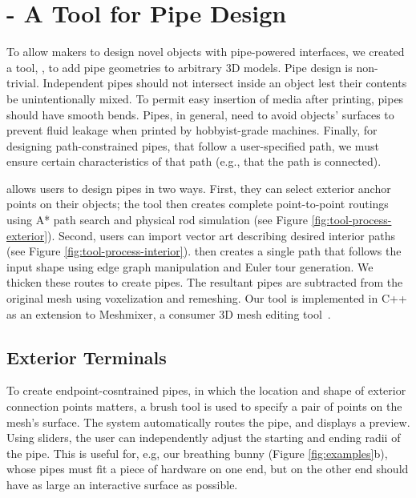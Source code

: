 \section{\systemname - A Tool for Pipe Design}
To allow makers to design novel objects with pipe-powered interfaces, we created a tool, \systemnamenospace, to add pipe geometries to arbitrary 3D models. Pipe design is non-trivial.  Independent pipes should not intersect inside an object lest their contents be unintentionally mixed.  To permit easy insertion of media after printing, pipes should have smooth bends.  Pipes, in general, need to avoid objects' surfaces to prevent fluid leakage when printed by hobbyist-grade machines.  Finally, for designing path-constrained pipes, that follow a user-specified path, we must ensure certain characteristics of that path (e.g., that the path is connected). 

 \systemname allows users to design pipes in two ways. First, they can select exterior anchor points on their objects; the tool then creates complete point-to-point routings using A* path search and physical rod simulation (see Figure \ref{fig:tool-process-exterior}). Second, users can import vector art describing desired interior paths (see Figure \ref{fig:tool-process-interior}).  \systemname then creates a single path that follows the input shape using edge graph manipulation and Euler tour generation.  We thicken these routes to create pipes.  The resultant pipes are subtracted from the original mesh using voxelization and remeshing. Our tool is implemented in C++ as an extension to Meshmixer, a consumer 3D mesh editing tool~\cite{Schmidt-meshmixer}.

\subsection{Exterior Terminals}

To create endpoint-cosntrained pipes, in which the location and shape of exterior connection points matters, a brush tool is used to specify a pair of points on the mesh's surface. The system automatically routes the pipe, and displays a preview.  Using sliders, the user can independently adjust the starting and ending radii of the pipe.  This is useful for, e.g, our breathing bunny (Figure \ref{fig:examples}b), whose pipes must fit a piece of hardware on one end, but on the other end should have as large an interactive surface as possible.

